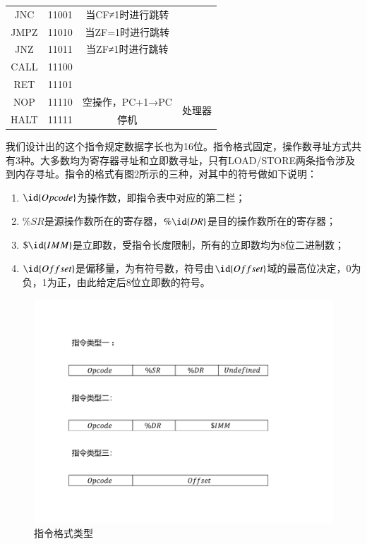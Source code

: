 \documentclass[titlepage, 11pt]{article}
\begin{document}
\begin{table}[H]
\begin{tabular}{c|c|c|c}
			JNC               & 11001 & 当CF≠1时进行跳转                                                     &                        \\ \cline{1-3}
			JMPZ              & 11010 & 当ZF=1时进行跳转                                                     &                        \\ \cline{1-3}
			JNZ               & 11011 & 当ZF≠1时进行跳转                                                     &                        \\ \cline{1-3}
			CALL              & 11100 &                                                                &                        \\ \cline{1-3}
			RET               & 11101 &                                                                &                        \\ \hline
			NOP               & 11110 & 空操作，PC+1→PC                                                    & \multirow{2}{*}{处理器}   \\ \cline{1-3}
			HALT              & 11111 & 停机                                                             &                        \\ 
		\end{tabular}
	\end{table}\par \normalsize
	我们设计出的这个指令规定数据字长也为16位。指令格式固定，操作数寻址方式共有3种。大多数均为寄存器寻址和立即数寻址，只有LOAD/STORE两条指令涉及到内存寻址。指令的格式有图2所示的三种，对其中的符号做如下说明：
	\begin{enumerate}
		\item $\id{Opcode}$为操作数，即指令表中对应的第二栏；
		\item $\%SR$是源操作数所在的寄存器，$\%\id{DR}$是目的操作数所在的寄存器；
		\item $\$\id{IMM}$是立即数，受指令长度限制，所有的立即数均为8位二进制数；
		\item $\id{Offset}$是偏移量，为有符号数，符号由$\id{Offset}$域的最高位决定，0为负，1为正，由此给定后8位立即数的符号。
	\end{enumerate}\par
	\begin{figure}[htb]
		\includegraphics[scale=0.5]{2.pdf}
		\caption{指令格式类型}
	\end{figure}
\end{document}
